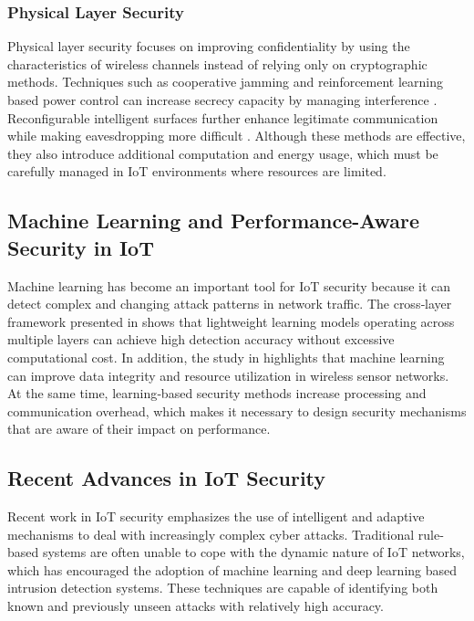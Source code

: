 \documentclass[a4paper,fleqn]{cas-dc}
\numberwithin{equation}{section}
\begin{document}
\subsubsection{Physical Layer Security}

Physical layer security focuses on improving confidentiality by using the characteristics of wireless channels instead of relying only on cryptographic methods. Techniques such as cooperative jamming and reinforcement learning based power control can increase secrecy capacity by managing interference \cite{martalo2024crosslayer2}. Reconfigurable intelligent surfaces further enhance legitimate communication while making eavesdropping more difficult \cite{kikissagbe2024ids}. Although these methods are effective, they also introduce additional computation and energy usage, which must be carefully managed in IoT environments where resources are limited.

\subsection{Machine Learning and Performance-Aware Security in IoT}

Machine learning has become an important tool for IoT security because it can detect complex and changing attack patterns in network traffic. The cross‐layer framework presented in \cite{altalhan2025imbalance} shows that lightweight learning models operating across multiple layers can achieve high detection accuracy without excessive computational cost. In addition, the study in \cite{etman2025mlwsn2} highlights that machine learning can improve data integrity and resource utilization in wireless sensor networks. At the same time, learning‐based security methods increase processing and communication overhead, which makes it necessary to design security mechanisms that are aware of their impact on performance.

\subsection{Recent Advances in IoT Security}

Recent work in IoT security emphasizes the use of intelligent and adaptive mechanisms to deal with increasingly complex cyber attacks. Traditional rule‐based systems are often unable to cope with the dynamic nature of IoT networks, which has encouraged the adoption of machine learning and deep learning based intrusion detection systems. These techniques are capable of identifying both known and previously unseen attacks with relatively high accuracy.
\end{document}
